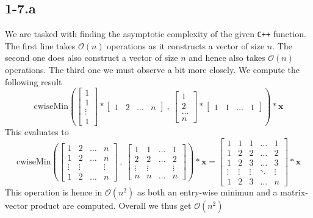 \documentclass{article}
\begin{document}
\subsection*{1-7.a} We are tasked with finding the asymptotic complexity of the given \verb|C++| function. The first line takes $\mathcal{O}\left(n\right)$ operations as it constructs a vector of size $n$. The second one does also construct a vector of size $n$ and hence also takes $\mathcal{O}\left(n\right)$  operations. The third one we must observe a bit more closely. We compute the following result
\begin{equation*}
    \text{cwiseMin}\left(\begin{bmatrix}
        1 \\1\\ \vdots \\ 1
    \end{bmatrix} * \begin{bmatrix}
        1 & 2 & \dots & n
    \end{bmatrix} \: , \: \begin{bmatrix}
        1 \\2 \\ \dots \\ n
    \end{bmatrix}*
    \begin{bmatrix}
        1 & 1& \dots & 1
    \end{bmatrix}\right) * \mathbf{x}
\end{equation*}
This evaluates to
\begin{equation*}
    \text{cwiseMin}\left(
    \begin{bmatrix}
    1 & 2 & \dots & n \\
    1 & 2 & \dots & n \\
    \vdots & \vdots & & \vdots \\
    1 & 2 & \dots & n
    \end{bmatrix} \: , \: \begin{bmatrix}
     1 & 1 & \dots & 1 \\
    2 & 2 & \dots & 2 \\
    \vdots & \vdots & & \vdots \\
    n & n & \dots & n
    \end{bmatrix}
    \right) * \mathbf{x} = \begin{bmatrix}
        1 & 1 & 1 & \dots & 1 \\
        1 & 2 & 2 & \dots & 2 \\
        1 & 2 & 3 & \dots & 3 \\
        \vdots & \vdots & \vdots &\ddots & \vdots \\
        1 & 2 & 3 & \dots & n
    \end{bmatrix} * \mathbf{x}
\end{equation*}
This operation is hence in $\mathcal{O}\left(n^{2}\right)$ as both an entry-wise minimun and a matrix-vector product are computed. Overall we thus get $\mathcal{O}\left(n^{2}\right)$
\end{document}
